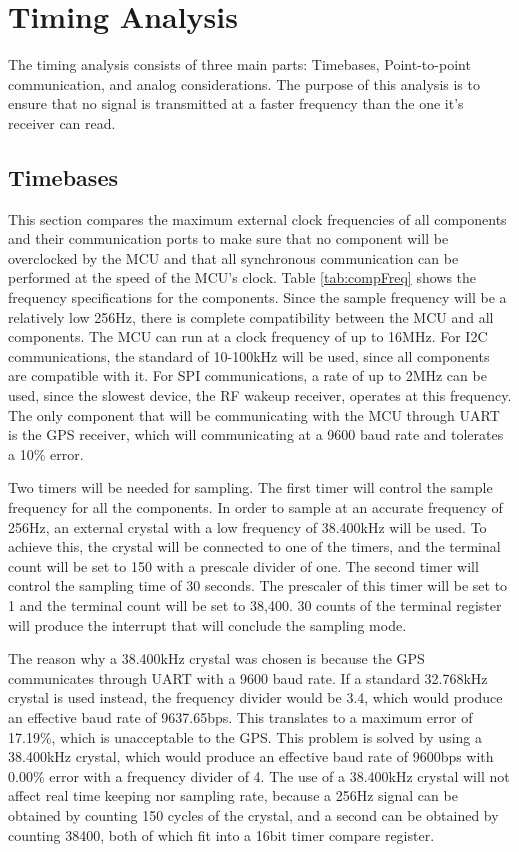 \section{Timing Analysis}
The timing analysis consists of three main parts: Timebases, Point-to-point communication, and analog considerations. The purpose of this analysis is to ensure that no signal is transmitted at a faster frequency than the one it's receiver can read.

\subsection{Timebases}
This section compares the maximum external clock frequencies of all components and their communication ports to make sure that no component will be overclocked by the MCU and that all synchronous communication can be performed at the speed of the MCU's clock. Table \ref{tab:compFreq} shows the frequency specifications for the components.  Since the sample frequency will be a relatively low 256Hz, there is complete compatibility between the MCU and all components. The MCU can run at a clock frequency of up to 16MHz. For I2C communications, the standard of 10-100kHz will be used, since all components are compatible with it. For SPI communications, a rate of up to 2MHz can be used, since the slowest device, the RF wakeup receiver, operates at this frequency. The only component that will be communicating with the MCU through UART is the GPS receiver, which will communicating at a 9600 baud rate and tolerates a 10\% error.

Two timers will be needed for sampling. The first timer will control the sample frequency for all the components.  In order to sample at an accurate frequency of 256Hz, an external crystal with a low frequency of 38.400kHz will be used. To achieve this, the crystal will be connected to one of the timers, and the terminal count will be set to 150 with a prescale divider of one. The second timer will control the sampling time of 30 seconds. The prescaler of this timer will be set to 1 and the terminal count will be set to 38,400. 30 counts of the terminal register will produce the interrupt that will conclude the sampling mode.

The reason why a 38.400kHz crystal was chosen is because the GPS communicates through UART with a 9600 baud rate. If a standard 32.768kHz crystal is used instead, the frequency divider would be 3.4, which would produce an effective baud rate of 9637.65bps. This translates to a maximum error of 17.19\%, which is unacceptable to the GPS. This problem is solved by using a 38.400kHz crystal, which would produce an effective baud rate of 9600bps with 0.00\% error with a frequency divider of 4. The use of a 38.400kHz crystal will not affect real time keeping nor sampling rate, because a 256Hz signal can be obtained by counting 150 cycles of the crystal, and a second can be obtained by counting 38400, both of which fit into a 16bit timer compare register.

